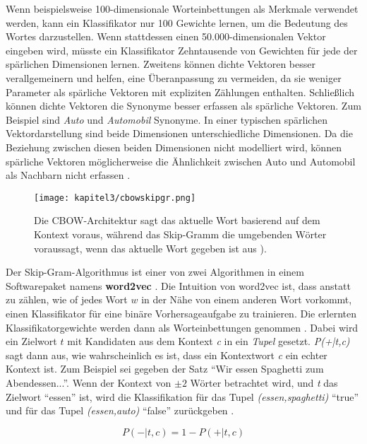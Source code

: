 Wenn beispielsweise 100-dimensionale Worteinbettungen als Merkmale verwendet werden, kann ein Klassifikator nur 100 Gewichte lernen, um die Bedeutung des Wortes darzustellen. Wenn  stattdessen einen 50.000-dimensionalen Vektor eingeben wird, müsste ein Klassifikator Zehntausende von Gewichten für jede der spärlichen Dimensionen lernen. Zweitens können dichte Vektoren besser verallgemeinern und helfen, eine Überanpassung zu vermeiden, da sie weniger Parameter als spärliche Vektoren mit expliziten Zählungen enthalten. Schließlich können dichte Vektoren die Synonyme besser erfassen als spärliche Vektoren. Zum Beispiel sind \textit{Auto} und \textit{Automobil} Synonyme. In einer typischen spärlichen Vektordarstellung sind beide Dimensionen unterschiedliche Dimensionen. Da die Beziehung zwischen diesen beiden Dimensionen nicht modelliert wird, können spärliche Vektoren möglicherweise die Ähnlichkeit zwischen Auto und Automobil als Nachbarn nicht erfassen \cite*[110-111]{Jurafskya}.


\begin{figure}[H]
    \centering
    \texttt{[image: kapitel3/cbowskipgr.png]}
    \caption[Vergleich zwischen CBOW und Skip-Gram Architektur]{Die CBOW-Architektur sagt das aktuelle Wort basierend auf dem Kontext voraus, während das Skip-Gramm die umgebenden Wörter voraussagt, wenn das aktuelle Wort gegeben ist aus \cite*{Mikolov}).}
    \label{cbowskipgr}
\end{figure}

Der Skip-Gram-Algorithmus ist einer von zwei Algorithmen in einem Softwarepaket namens \textbf{word2vec} \cite*{Mikolov2013}\cite*{Mikolov}. Die Intuition von word2vec ist, dass anstatt zu zählen, wie of jedes Wort $w$ in der Nähe von einem anderen Wort vorkommt, einen Klassifikator für eine binäre Vorhersageaufgabe zu trainieren. Die erlernten Klassifikatorgewichte werden dann als Worteinbettungen genommen \cite*[111]{Jurafskya}. Dabei wird ein Zielwort $t$ mit Kandidaten aus dem Kontext \textit{c} in ein \textit{Tupel} gesetzt. \textit{P(+|t,c)} sagt dann aus, wie wahrscheinlich es ist, dass ein Kontextwort \textit{c} ein echter Kontext ist. Zum Beispiel sei gegeben der Satz \enquote{Wir essen Spaghetti zum Abendessen...}. Wenn der Kontext von $\pm 2$ Wörter betrachtet wird, und \textit{t} das Zielwort \enquote{essen} ist, wird die Klassifikation für das Tupel \textit{(essen,spaghetti)} \enquote{true} und für das Tupel \textit{(essen,auto)} \enquote{false} zurückgeben \cite*[111]{Jurafskya}.

\begin{equation} \label{Formel3_1}
    P(-|t,c) = 1-P(+|t,c)
\end{equation}

